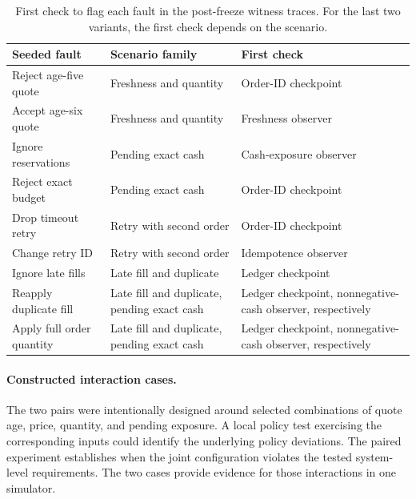 \begin{table}[ht]
\centering
\caption{First check to flag each fault in the post-freeze witness traces.
For the last two variants, the first check depends on the scenario.}
\label{tab:post-freeze-first-check}
\small
\begin{tabular}{@{}p{.25\linewidth}p{.26\linewidth}p{.42\linewidth}@{}}
\hline
Seeded fault & Scenario family & First check \\
\hline
Reject age-five quote & Freshness and quantity & Order-ID checkpoint \\
Accept age-six quote & Freshness and quantity & Freshness observer \\
Ignore reservations & Pending exact cash & Cash-exposure observer \\
Reject exact budget & Pending exact cash & Order-ID checkpoint \\
Drop timeout retry & Retry with second order & Order-ID checkpoint \\
Change retry ID & Retry with second order & Idempotence observer \\
Ignore late fills & Late fill and duplicate & Ledger checkpoint \\
Reapply duplicate fill & Late fill and duplicate, pending exact cash &
  Ledger checkpoint, nonnegative-cash observer, respectively \\
Apply full order quantity & Late fill and duplicate, pending exact cash &
  Ledger checkpoint, nonnegative-cash observer, respectively \\
\hline
\end{tabular}
\end{table}

\paragraph{Constructed interaction cases.}
The two pairs were intentionally designed around selected combinations
of quote age, price, quantity, and pending exposure. A local policy
test exercising the corresponding inputs could identify the underlying
policy deviations. The paired experiment establishes when the joint
configuration violates the tested system-level requirements. The two
cases provide evidence for those interactions in one simulator.
